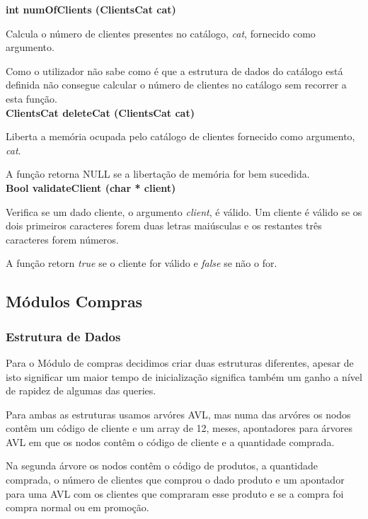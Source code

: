 \documentclass[12pt] {article}
\begin{document}
\noindent \textbf{int numOfClients (ClientsCat cat)}
\par Calcula o número de clientes presentes no catálogo, \emph{cat}, fornecido como argumento.
\par Como o utilizador não sabe como é que a estrutura de dados do catálogo está definida não consegue
calcular o número de clientes no catálogo sem recorrer a esta função. \\

\noindent \textbf{ClientsCat deleteCat (ClientsCat cat)}
\par Liberta a memória ocupada pelo catálogo de clientes fornecido como argumento, \emph{cat}.
\par A função retorna NULL se a libertação de memória for bem sucedida. \\

\noindent \textbf{Bool validateClient (char * client)}
\par Verifica se um dado cliente, o argumento \emph{client}, é válido. Um cliente é válido se os dois primeiros
caracteres forem duas letras maiúsculas e os restantes três caracteres forem números.
\par A função retorn \emph{true} se o cliente for válido e \emph{false} se não o for.

\subsection{Módulos Compras}

\subsubsection{Estrutura de Dados}
\indent\par Para o Módulo de compras decidimos criar duas estruturas diferentes, apesar de isto significar um maior 
tempo  de inicialização significa também um ganho a nível de rapidez de algumas das queries.
 \par Para ambas as estruturas usamos arvóres AVL, mas numa das arvóres os nodos contêm um código de cliente 
 e um array de 12, meses, apontadores para árvores AVL em que os nodos contêm o código de cliente e a 
 quantidade comprada.
 \par Na segunda árvore os nodos contêm o código de produtos, a quantidade comprada, o número de clientes que 
 comprou o dado produto e um apontador para uma AVL com os clientes que compraram esse produto e se a 
 compra foi compra normal ou em promoção.
 
\end{document}
